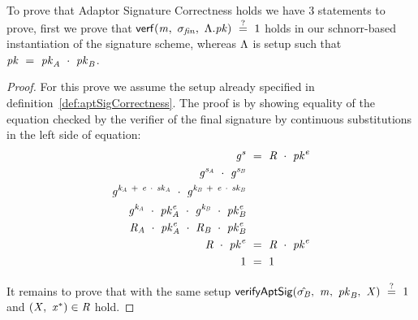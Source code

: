 To prove that Adaptor Signature Correctness holds we have 3 statements to prove, first we prove that $\mathsf{verf}(\mathit{m} ,~ \sigma_{\mathit{fin}} ,~ \Lambda.\mathit{pk}) ~\stackrel{?}{=}~ 1$ holds in our
schnorr-based instantiation of the signature scheme, whereas $\Lambda$ is setup such that $\mathit{pk} ~=~ \mathit{pk}_{\mathit{A}} ~\cdot~ \mathit{pk}_{\mathit{B}}$.

\begin{proof}
    \label{prf:aptSchnorrPreSigCorr}
    For this prove we assume the setup already specified in definition~\ref{def:aptSigCorrectness}.
    The proof is by showing equality of the equation checked by the verifier of the final signature by continuous substitutions in the left side of equation:
    \begin{align}
        \mathit{g}^{\mathit{s}} &~=~ \mathit{R} ~\cdot~ \mathit{pk}^{\mathit{e}} \\
        \mathit{g}^{\mathit{s}_{\mathit{A}}} ~\cdot~ \mathit{g}^{\mathit{s}_{\mathit{B}}} & \\
        \mathit{g}^{\mathit{\mathit{k}_{\mathit{A}}} ~+~ \mathit{e} ~\cdot~ \mathit{sk}_{\mathit{A}}} ~\cdot~ \mathit{g}^{\mathit{\mathit{k}_{\mathit{B}}} ~+~ \mathit{e} ~\cdot~ \mathit{sk}_{\mathit{B}}} & \\
        \mathit{g}^{\mathit{\mathit{k}_{\mathit{A}}}} ~\cdot~ \mathit{pk}_{\mathit{A}}^{\mathit{e}} ~\cdot~ \mathit{g}^{\mathit{\mathit{k}_{\mathit{B}}}} ~\cdot~ \mathit{pk}_{\mathit{B}}^{\mathit{e}} & \\
        \mathit{R}_{\mathit{A}} ~\cdot~ \mathit{pk}_{\mathit{A}}^{\mathit{e}} ~\cdot~ \mathit{R}_{\mathit{B}} ~\cdot~ \mathit{pk}_{\mathit{B}}^{\mathit{e}} & \\
        \mathit{R} ~\cdot~ \mathit{pk}^{\mathit{e}} & ~=~ \mathit{R} ~\cdot~ \mathit{pk}^{\mathit{e}} \\
        1 & ~=~ 1
    \end{align}

    It remains to prove that with the same setup $\mathsf{verifyAptSig}(\hat{\sigma_{\mathit{B}}} ,~ \mathit{m} ,~ \mathit{pk}_{\mathit{B}} ,~ \mathit{X}) ~\stackrel{?}{=}~ 1$ and
    $(\mathit{X} ,~ \mathit{x}^*) \in \mathit{R}$ hold.


\end{proof}
